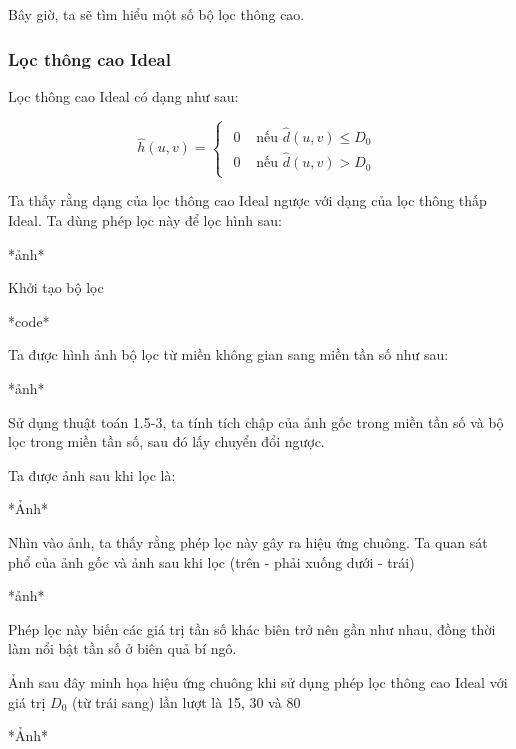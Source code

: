 \documentclass[12pt,a4paper]{report}
\numberwithin{equation}{section}
\theoremstyle{definition} %
\begin{document}
Bây giờ, ta sẽ tìm hiểu một số bộ lọc thông cao.

\subsubsection{Lọc thông cao Ideal}

Lọc thông cao Ideal có dạng như sau:

\begin{equation}
    \hat{h}(u,v)=\begin{cases}
    \begin{aligned}
        0& \text{ nếu }  \hat{d}(u,v) \le D_0\\
        0& \text{ nếu }  \hat{d}(u,v) > D_0
    \end{aligned}
\end{cases}
\end{equation}


Ta thấy rằng dạng của lọc thông cao Ideal ngược với dạng của lọc thông thấp Ideal. Ta dùng phép lọc này để lọc hình sau: 

*ảnh*

Khởi tạo bộ lọc 

*code*

Ta được hình ảnh bộ lọc từ miền không gian sang miền tần số như sau:

*ảnh*

Sử dụng thuật toán 1.5-3, ta tính tích chập của ảnh gốc trong miền tần số và bộ lọc trong miền tần số, sau đó lấy chuyển đổi ngược.

Ta được ảnh sau khi lọc là:

*Ảnh*

Nhìn vào ảnh, ta thấy rằng phép lọc này gây ra hiệu ứng chuông. Ta quan sát phổ của ảnh gốc và ảnh sau khi lọc (trên - phải xuống dưới - trái)

*ảnh*

Phép lọc này biến các giá trị tần số khác biên trở nên gần như nhau, đồng thời làm nổi bật tần số ở biên quả bí ngô.

Ảnh sau đây minh họa hiệu ứng chuông khi sử dụng phép lọc thông cao Ideal với giá trị $D_0$ (từ trái sang) lần lượt là 15, 30 và 80

*Ảnh*
\end{document}
